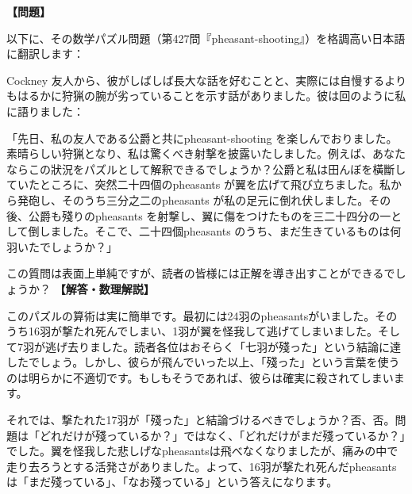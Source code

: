 \documentclass[10pt,a4paper,oneside,openany]{ltjsbook}
\begin{document}
\begin{tcolorbox}[colback=softblue,colframe=primaryblue,title=\textbf{第 427 問：雉射ting （原題: PHEASANT-SHOOTING.）},arc=2mm,boxrule=1pt,breakable]
\textbf{【問題】}\par\vspace{0.3em}
以下に、その数学パズル問題（第427問『pheasant-shooting』）を格調高い日本語に翻訳します：

 Cockney 友人から、彼がしばしば長大な話を好むことと、実際には自慢するよりもはるかに狩猟の腕が劣っていることを示す話がありました。彼は回のように私に語りました：

「先日、私の友人である公爵と共にpheasant-shooting を楽しんでおりました。素晴らしい狩猟となり、私は驚くべき射撃を披露いたしました。例えば、あなたならこの狀況をパズルとして解釈できるでしょうか？公爵と私は田んぼを橫斷していたところに、突然二十四個のpheasants が翼を広げて飛び立ちました。私から発砲し、そのうち三分之二のpheasants が私の足元に倒れ伏しました。その後、公爵も殘りのpheasants を射撃し、翼に傷をつけたものを三二十四分の一として倒しました。そこで、二十四個pheasants のうち、まだ生きているものは何羽いたでしょうか？」

この質問は表面上単純ですが、読者の皆様には正解を導き出すことができるでしょうか？
\tcblower
\textbf{【解答・数理解説】}\par\vspace{0.3em}
このパズルの算術は実に簡単です。最初には24羽のpheasantsがいました。そのうち16羽が撃たれ死んでしまい、1羽が翼を怪我して逃げてしまいました。そして7羽が逃げ去りました。読者各位はおそらく「七羽が殘った」という結論に達したでしょう。しかし、彼らが飛んでいった以上、「殘った」という言葉を使うのは明らかに不適切です。もしもそうであれば、彼らは確実に殺されてしまいます。

それでは、撃たれた17羽が「殘った」と結論づけるべきでしょうか？否、否。問題は「どれだけが殘っているか？」ではなく、「どれだけがまだ殘っているか？」でした。翼を怪我した悲しげなpheasantsは飛べなくなりましたが、痛みの中で走り去ろうとする活発さがありました。よって、16羽が撃たれ死んだpheasantsは「まだ殘っている」、「なお殘っている」という答えになります。
\end{tcolorbox}
\end{document}
